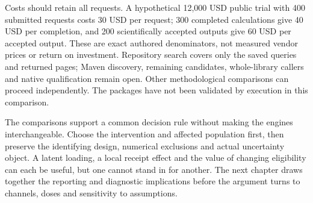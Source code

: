 Costs should retain all requests. A hypothetical 12,000 USD public trial with 400 submitted requests costs 30 USD per request; 300 completed calculations give 40 USD per completion, and 200 scientifically accepted outputs give 60 USD per accepted output. These are exact authored denominators, not measured vendor prices or return on investment. Repository search covers only the saved queries and returned pages; Maven discovery, remaining candidates, whole-library callers and native qualification remain open. Other methodological comparisons can proceed independently. The packages have not been validated by execution in this comparison.~\citep{exec25_javaiv_choice}


The comparisons support a common decision rule without making the engines
interchangeable. Choose the intervention and affected population first, then
preserve the identifying design, numerical exclusions and actual uncertainty
object. A latent loading, a local receipt effect and the value of changing
eligibility can each be useful, but one cannot stand in for another. The next
chapter draws together the reporting and diagnostic implications before the
argument turns to channels, doses and sensitivity to assumptions.

